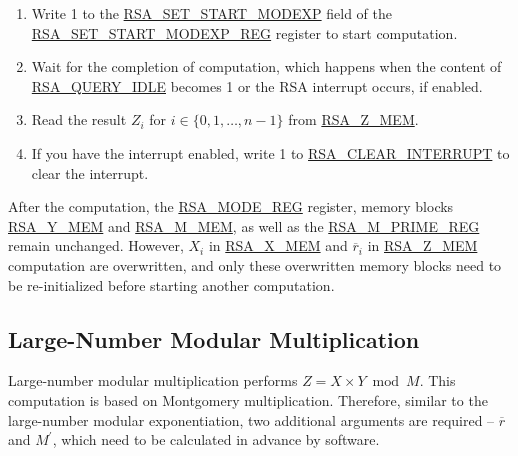 \documentclass[main\_\_EN.tex]{subfiles}
\begin{document}
\begin{enumerate}
       Users need to write data to each memory block only according to the length of the number; data beyond this length is ignored.

    \item Write 1 to the \hyperref[fielddesc:RSASETSTARTMODEXP]{RSA\_SET\_START\_MODEXP} field of the \hyperref[regdesc:RSASETSTARTMODEXPREG]{RSA\_SET\_START\_MODEXP\_REG} register to start computation.

    \item Wait for the completion of computation, which happens when the content of \hyperref[fielddesc:RSAQUERYIDLE]{RSA\_QUERY\_IDLE} becomes 1 or the RSA interrupt occurs, if enabled.

    \item Read the result \begin{math}Z_{i}\end{math}
        for \begin{math}i \in \{ 0, 1, \dots, n-1 \} \end{math}
        from \hyperref[regdesc:RSAmemory]{RSA\_Z\_MEM}.

    \item If you have the interrupt enabled, write 1 to \hyperref[fielddesc:RSACLEARINTERRUPT]{RSA\_CLEAR\_INTERRUPT} to clear the interrupt.

\end{enumerate}

After the computation, the \hyperref[regdesc:RSAMODEREG]{RSA\_MODE\_REG} register, memory blocks \hyperref[regdesc:RSAmemory]{RSA\_Y\_MEM} and \hyperref[regdesc:RSAmemory]{RSA\_M\_MEM}, as well as the \hyperref[regdesc:RSAMPRIMEREG]{RSA\_M\_PRIME\_REG} remain unchanged. However, \begin{math}X_{i}\end{math} in \hyperref[regdesc:RSAmemory]{RSA\_X\_MEM} and \begin{math}\overline{r}_{i}\end{math} in \hyperref[regdesc:RSAmemory]{RSA\_Z\_MEM} computation are overwritten, and only these overwritten memory blocks need to be re-initialized before starting another computation.

\subsection{Large-Number Modular Multiplication}

Large-number modular multiplication performs \begin{math}Z = X \times Y \bmod M\end{math}. This computation is based on Montgomery multiplication.
Therefore, similar to the large-number modular exponentiation, two additional arguments are required -- \begin{math}\overline{r}\end{math} and
\begin{math}M^{\prime}\end{math}, which need to be calculated in advance by software.
\end{document}
